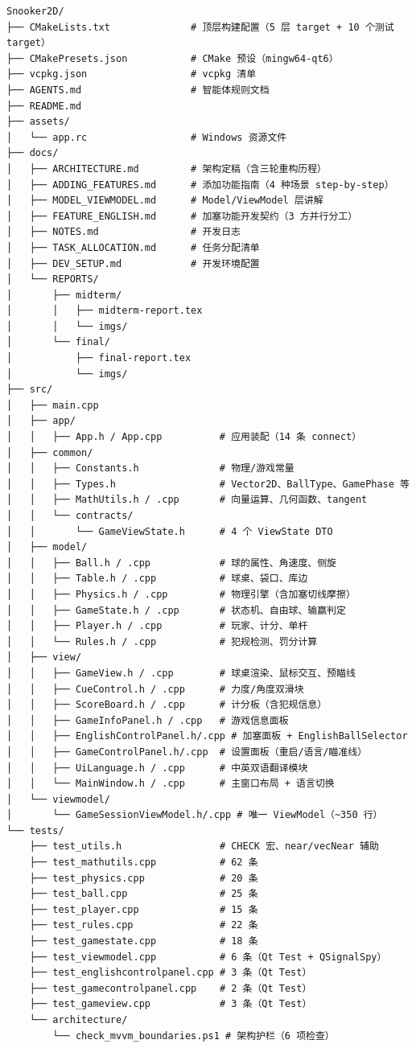 \documentclass[11pt]{ctexart}
\begin{document}
\begin{verbatim}
Snooker2D/
├── CMakeLists.txt              # 顶层构建配置（5 层 target + 10 个测试 target）
├── CMakePresets.json           # CMake 预设（mingw64-qt6）
├── vcpkg.json                  # vcpkg 清单
├── AGENTS.md                   # 智能体规则文档
├── README.md
├── assets/
│   └── app.rc                  # Windows 资源文件
├── docs/
│   ├── ARCHITECTURE.md         # 架构定稿（含三轮重构历程）
│   ├── ADDING_FEATURES.md      # 添加功能指南（4 种场景 step-by-step）
│   ├── MODEL_VIEWMODEL.md      # Model/ViewModel 层讲解
│   ├── FEATURE_ENGLISH.md      # 加塞功能开发契约（3 方并行分工）
│   ├── NOTES.md                # 开发日志
│   ├── TASK_ALLOCATION.md      # 任务分配清单
│   ├── DEV_SETUP.md            # 开发环境配置
│   └── REPORTS/
│       ├── midterm/
│       │   ├── midterm-report.tex
│       │   └── imgs/
│       └── final/
│           ├── final-report.tex
│           └── imgs/
├── src/
│   ├── main.cpp
│   ├── app/
│   │   ├── App.h / App.cpp          # 应用装配（14 条 connect）
│   ├── common/
│   │   ├── Constants.h              # 物理/游戏常量
│   │   ├── Types.h                  # Vector2D、BallType、GamePhase 等
│   │   ├── MathUtils.h / .cpp       # 向量运算、几何函数、tangent
│   │   └── contracts/
│   │       └── GameViewState.h      # 4 个 ViewState DTO
│   ├── model/
│   │   ├── Ball.h / .cpp            # 球的属性、角速度、侧旋
│   │   ├── Table.h / .cpp           # 球桌、袋口、库边
│   │   ├── Physics.h / .cpp         # 物理引擎（含加塞切线摩擦）
│   │   ├── GameState.h / .cpp       # 状态机、自由球、输赢判定
│   │   ├── Player.h / .cpp          # 玩家、计分、单杆
│   │   └── Rules.h / .cpp           # 犯规检测、罚分计算
│   ├── view/
│   │   ├── GameView.h / .cpp        # 球桌渲染、鼠标交互、预瞄线
│   │   ├── CueControl.h / .cpp      # 力度/角度双滑块
│   │   ├── ScoreBoard.h / .cpp      # 计分板（含犯规信息）
│   │   ├── GameInfoPanel.h / .cpp   # 游戏信息面板
│   │   ├── EnglishControlPanel.h/.cpp # 加塞面板 + EnglishBallSelector
│   │   ├── GameControlPanel.h/.cpp  # 设置面板（重启/语言/瞄准线）
│   │   ├── UiLanguage.h / .cpp      # 中英双语翻译模块
│   │   └── MainWindow.h / .cpp      # 主窗口布局 + 语言切换
│   └── viewmodel/
│       └── GameSessionViewModel.h/.cpp # 唯一 ViewModel（~350 行）
└── tests/
    ├── test_utils.h                 # CHECK 宏、near/vecNear 辅助
    ├── test_mathutils.cpp           # 62 条
    ├── test_physics.cpp             # 20 条
    ├── test_ball.cpp                # 25 条
    ├── test_player.cpp              # 15 条
    ├── test_rules.cpp               # 22 条
    ├── test_gamestate.cpp           # 18 条
    ├── test_viewmodel.cpp           # 6 条（Qt Test + QSignalSpy）
    ├── test_englishcontrolpanel.cpp # 3 条（Qt Test）
    ├── test_gamecontrolpanel.cpp    # 2 条（Qt Test）
    ├── test_gameview.cpp            # 3 条（Qt Test）
    └── architecture/
        └── check_mvvm_boundaries.ps1 # 架构护栏（6 项检查）
\end{verbatim}
\end{document}
